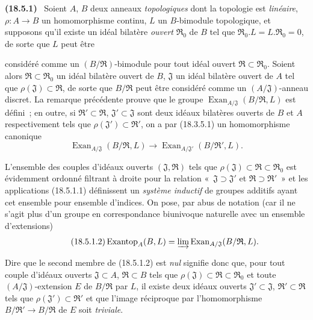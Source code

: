 \documentclass[10pt,oneside]{book}
\makeatletter
\newcommand{\setmanualcurrentlabel}[1]{\def\@currentlabel{#1}}
\newcommand{\oldpage}[2][]{%
  \setcounter{footnote}{0}%
  \marginpar{\scriptsize\textbf{#1}~|~#2}\ignorespaces}
\newenvironment{env}[1][]{\setmanualcurrentlabel{#1}\par\medskip\noindent\textbf{(#1)}\ }{\par}
\makeatother
\begin{document}
\begin{env}[18.5.1]
\label{0.18.5.1-fr}
Soient $A$, $B$ deux anneaux \emph{topologiques} dont la topologie est
\emph{linéaire}, $\rho:A\to B$ un homomorphisme continu, $L$ un $B$-bimodule
topologique, et supposons qu'il existe un idéal bilatère \emph{ouvert}
$\mathfrak R_0$ de $B$ tel que
$\mathfrak R_0.L=L.\mathfrak R_0=0$, de sorte que $L$ peut être

\oldpage[0\textsubscript{IV-1}]{67}

considéré comme un $(B/\mathfrak R)$-bimodule pour tout idéal ouvert
$\mathfrak R\subset\mathfrak R_0$. Soient alors
$\mathfrak R\subset\mathfrak R_0$ un idéal bilatère ouvert de $B$,
$\mathfrak J$ un idéal bilatère ouvert de $A$ tel que
$\rho(\mathfrak J)\subset\mathfrak R$, de sorte que $B/\mathfrak R$ peut être
considéré comme un $(A/\mathfrak J)$-anneau discret. La remarque précédente
prouve que le groupe
$\operatorname{Exan}_{A/\mathfrak J}(B/\mathfrak R,L)$ est défini~; en outre,
si $\mathfrak R'\subset\mathfrak R$, $\mathfrak J'\subset\mathfrak J$ sont
deux idéaux bilatères ouverts de $B$ et $A$ respectivement tels que
$\rho(\mathfrak J')\subset\mathfrak R'$, on a par (18.3.5.1) un homomorphisme
canonique
\begin{equation}
\label{0.18.5.1.1-fr}
\tag{18.5.1.1}
  \operatorname{Exan}_{A/\mathfrak J}(B/\mathfrak R,L)
  \longrightarrow
  \operatorname{Exan}_{A/\mathfrak J'}(B/\mathfrak R',L).
\end{equation}

L'ensemble des couples d'idéaux ouverts $(\mathfrak J,\mathfrak R)$ tels que
$\rho(\mathfrak J)\subset\mathfrak R\subset\mathfrak R_0$ est évidemment
ordonné filtrant à droite pour la relation «~$\mathfrak J\supset\mathfrak J'$
et $\mathfrak R\supset\mathfrak R'$~» et les applications (18.5.1.1)
définissent un \emph{système inductif} de groupes additifs ayant cet ensemble
pour ensemble d'indices. On pose, par abus de notation (car il ne s'agit plus
d'un groupe en correspondance biunivoque naturelle avec un ensemble
d'extensions)
\begin{equation}
\label{0.18.5.1.2-fr}
\tag{18.5.1.2}
  \operatorname{Exantop}_A(B,L)
  =\varinjlim\operatorname{Exan}_{A/\mathfrak J}(B/\mathfrak R,L).
\end{equation}

Dire que le second membre de (18.5.1.2) est \emph{nul} signifie donc que, pour
tout couple d'idéaux ouverts $\mathfrak J\subset A$, $\mathfrak R\subset B$
tels que $\rho(\mathfrak J)\subset\mathfrak R\subset\mathfrak R_0$ et toute
$(A/\mathfrak J)$-extension $E$ de $B/\mathfrak R$ par $L$, il existe deux
idéaux ouverts $\mathfrak J'\subset\mathfrak J$,
$\mathfrak R'\subset\mathfrak R$ tels que
$\rho(\mathfrak J')\subset\mathfrak R'$ et que l'image réciproque par
l'homomorphisme $B/\mathfrak R'\to B/\mathfrak R$ de $E$ soit \emph{triviale}.


\end{env}
\end{document}
